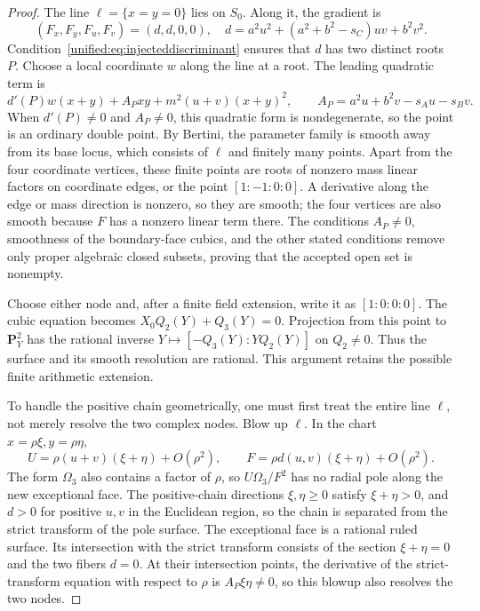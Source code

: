 \documentclass[11pt,a4paper,oneside]{article}
\theoremstyle{plain}
\theoremstyle{definition}
\theoremstyle{remark}
\numberwithin{equation}{section}
\begin{document}
\begin{proof}
The line $\ell=\{x=y=0\}$ lies on $S_0$. Along it, the gradient is
\[
 (F_x,F_y,F_u,F_v)=(d,d,0,0),\quad
 d=a^2u^2+(a^2+b^2-s_C)uv+b^2v^2.
\]
Condition~\eqref{unified:eq:injecteddiscriminant} ensures that $d$ has two distinct roots $P$.
Choose a local coordinate $w$ along the line at a root. The leading quadratic term is
\[
 d'(P)w(x+y)+A_Pxy+m^2(u+v)(x+y)^2,
 \qquad A_P=a^2u+b^2v-s_Au-s_Bv.
\]
When $d'(P)\ne0$ and $A_P\ne0$, this quadratic form is nondegenerate, so the point is an ordinary double point.
By Bertini, the parameter family is smooth away from its base locus, which consists of $\ell$ and finitely many points.
Apart from the four coordinate vertices, these finite points are roots of nonzero mass linear factors on coordinate edges,
or the point $[1:-1:0:0]$. A derivative along the edge or mass direction is nonzero, so they are smooth;
the four vertices are also smooth because $F$ has a nonzero linear term there.
The conditions $A_P\ne0$, smoothness of the boundary-face cubics, and the other stated conditions remove only proper algebraic closed subsets, proving that the accepted open set is nonempty.

Choose either node and, after a finite field extension, write it as $[1:0:0:0]$.
The cubic equation becomes $X_0Q_2(Y)+Q_3(Y)=0$.
Projection from this point to $\mathbf P^2_Y$ has the rational inverse
$Y\mapsto[-Q_3(Y):YQ_2(Y)]$ on $Q_2\ne0$.
Thus the surface and its smooth resolution are rational. This argument retains the possible finite arithmetic extension.

To handle the positive chain geometrically, one must first treat the entire line $\ell$, not merely resolve the two complex nodes.
Blow up $\ell$. In the chart $x=\rho\xi,y=\rho\eta$,
\[
 U=\rho(u+v)(\xi+\eta)+O(\rho^2),\qquad
 F=\rho d(u,v)(\xi+\eta)+O(\rho^2).
\]
The form $\Omega_3$ also contains a factor of $\rho$, so $U\Omega_3/F^2$
has no radial pole along the new exceptional face. The positive-chain directions $\xi,\eta\ge0$ satisfy $\xi+\eta>0$,
and $d>0$ for positive $u,v$ in the Euclidean region, so the chain is separated from the strict transform of the pole surface.
The exceptional face is a rational ruled surface. Its intersection with the strict transform consists of the section $\xi+\eta=0$
and the two fibers $d=0$. At their intersection points, the derivative of the strict-transform equation with respect to $\rho$
is $A_P\xi\eta\ne0$, so this blowup also resolves the two nodes.


\end{proof}
\end{document}

